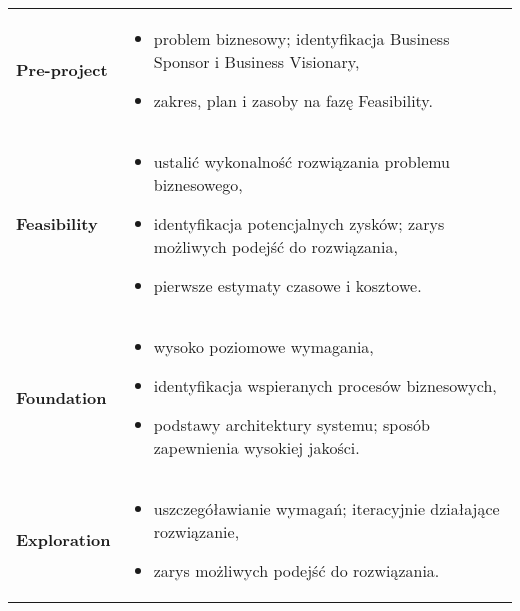 \documentclass[a4paper]{article}
\begin{document}
    \begin{table}[H]
        \begin{center}
            \begin{tabular}{ p{} p{} }
                \textbf{Pre-project}
                &
                \begin{itemize}
                    \item problem biznesowy; identyfikacja Business Sponsor i Business Visionary,
                    \item zakres, plan i zasoby na fazę Feasibility.
                \end{itemize}
                \\

                \textbf{Feasibility}
                &
                \begin{itemize}
                    \item ustalić wykonalność rozwiązania problemu biznesowego,
                    \item identyfikacja potencjalnych zysków; zarys możliwych podejść do rozwiązania,
                    \item pierwsze estymaty czasowe i kosztowe.
                \end{itemize}
                \\

                \textbf{Foundation}
                &
                \begin{itemize}
                    \item wysoko poziomowe wymagania,
                    \item identyfikacja wspieranych procesów biznesowych,
                    \item podstawy architektury systemu; sposób zapewnienia wysokiej jakości.
                \end{itemize}
                \\

                \textbf{Exploration}
                &
                \begin{itemize}
                    \item uszczegóławianie wymagań; iteracyjnie działające rozwiązanie,
                    \item zarys możliwych podejść do rozwiązania.
                \end{itemize}
                \\


\end{tabular}
\end{center}
\end{table}
\end{document}
